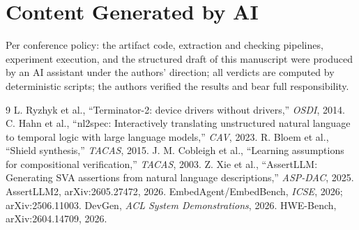 \documentclass[conference]{IEEEtran}
\begin{document}
\section*{Content Generated by AI}
Per conference policy: the artifact code, extraction and checking
pipelines, experiment execution, and the structured draft of this
manuscript were produced by an AI assistant under the authors'
direction; all verdicts are computed by deterministic scripts; the
authors verified the results and bear full responsibility.

\begin{thebibliography}{9}
 L. Ryzhyk et al., ``Terminator-2: device drivers
without drivers,'' \emph{OSDI}, 2014.
 C. Hahn et al., ``nl2spec: Interactively translating
unstructured natural language to temporal logic with large language
models,'' \emph{CAV}, 2023.
 R. Bloem et al., ``Shield synthesis,'' \emph{TACAS},
2015.
 J. M. Cobleigh et al., ``Learning assumptions for
compositional verification,'' \emph{TACAS}, 2003.
 Z. Xie et al., ``AssertLLM: Generating SVA
assertions from natural language descriptions,'' \emph{ASP-DAC}, 2025.
 AssertLLM2, arXiv:2605.27472, 2026.
 EmbedAgent/EmbedBench, \emph{ICSE}, 2026;
arXiv:2506.11003.
 DevGen, \emph{ACL System Demonstrations}, 2026.
 HWE-Bench, arXiv:2604.14709, 2026.
\end{thebibliography}
\end{document}
